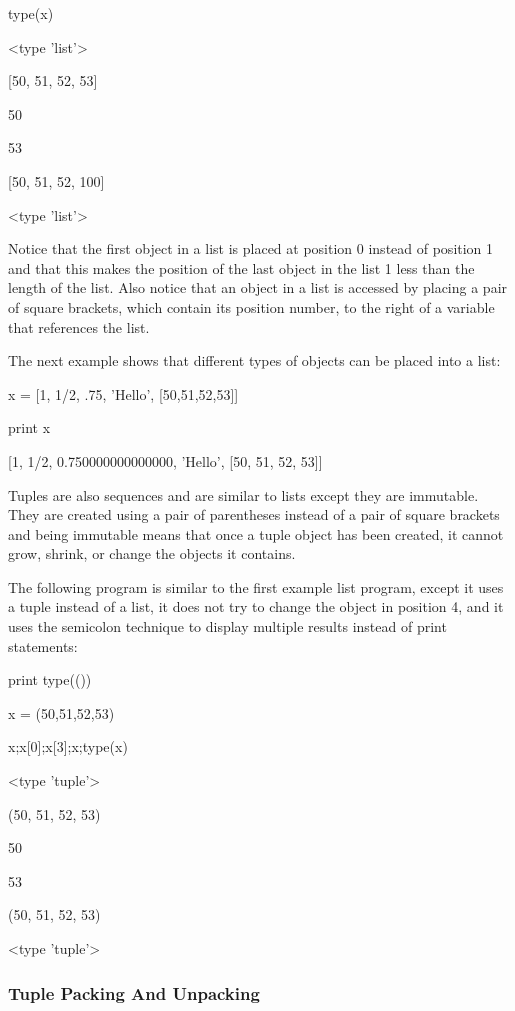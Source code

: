 \documentclass[12pt,oneside]{book}
\begin{document}
type(x)

{\textbar}

{\textless}type 'list'{\textgreater}

[50, 51, 52, 53]

50

53

[50, 51, 52, 100]

{\textless}type 'list'{\textgreater}


Notice that the first object in a list is placed at position 0 instead of position 1 and that this makes the position of the last object in the list 1 less than the length of the list. Also notice that an object in a list is accessed by placing a pair of square brackets, which contain its position number, to the right of a variable that references the list.

The next example shows that different types of objects can be placed into a list: 

x = [1, 1/2, .75, 'Hello', [50,51,52,53]]

print x

{\textbar}

[1, 1/2, 0.750000000000000, 'Hello', [50, 51, 52, 53]]

Tuples are also sequences and are similar to lists except they are immutable. They are created using a pair of parentheses instead of a pair of square brackets and being immutable means that once a tuple object has been created, it cannot grow, shrink, or change the objects it contains. 

The following program is similar to the first example list program, except it uses a tuple instead of a list, it does not try to change the object in position 4, and it uses the semicolon technique to display multiple results instead of print statements: 

print type(())

x = (50,51,52,53)

x;x[0];x[3];x;type(x)

{\textbar}

{\textless}type 'tuple'{\textgreater}

(50, 51, 52, 53)

50

53

(50, 51, 52, 53)

{\textless}type 'tuple'{\textgreater}


\subsubsection[Tuple Packing And Unpacking]{Tuple Packing And Unpacking}
\end{document}
